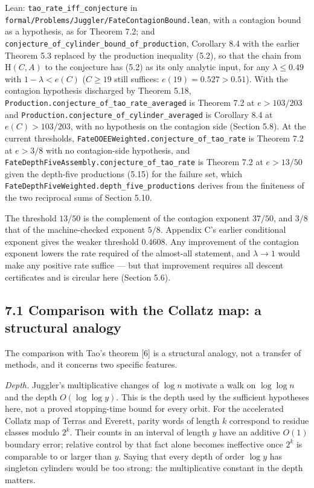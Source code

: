 \documentclass[11pt,a4paper]{article}
\begin{document}
Lean: \texttt{\nolinkurl{tao_rate_iff_conjecture}} in
\texttt{\nolinkurl{formal/Problems/Juggler/FateContagionBound.lean}},
with a contagion bound as a hypothesis, as for Theorem 7.2; and
\texttt{\nolinkurl{conjecture_of_cylinder_bound_of_production}},
Corollary 8.4 with the earlier Theorem 5.3 replaced by the production
inequality (5.2), so that the chain from \(\mathrm H(C,A)\) to the
conjecture has (5.2) as its only analytic input, for any
\(\lambda\le 0.49\) with \(1-\lambda<e(C)\) (\(C\ge 19\) still suffices:
\(e(19)=0.527>0.51\)). With the contagion hypothesis discharged by
Theorem 5.18,
\texttt{\nolinkurl{Production.conjecture_of_tao_rate_averaged}} is
Theorem 7.2 at \(e>103/203\) and
\texttt{\nolinkurl{Production.conjecture_of_cylinder_averaged}} is
Corollary 8.4 at \(e(C)>103/203\), with no hypothesis on the contagion
side (Section 5.8). At the current thresholds,
\texttt{\nolinkurl{FateOOEEWeighted.conjecture_of_tao_rate}} is Theorem
7.2 at \(e>3/8\) with no contagion-side hypothesis, and
\texttt{\nolinkurl{FateDepthFiveAssembly.conjecture_of_tao_rate}} is
Theorem 7.2 at \(e>13/50\) given the depth-five productions (5.15) for
the failure set, which
\texttt{\nolinkurl{FateDepthFiveWeighted.depth_five_productions}}
derives from the finiteness of the two reciprocal sums of Section 5.10.

The threshold \(13/50\) is the complement of the contagion exponent
\(37/50\), and \(3/8\) that of the machine-checked exponent \(5/8\).
Appendix C's earlier conditional exponent gives the weaker threshold
\(0.4608\). Any improvement of the contagion exponent lowers the rate
required of the almost-all statement, and \(\lambda\to 1\) would make
any positive rate suffice --- but that improvement requires all descent
certificates and is circular here (Section 5.6).

\subsection{7.1 Comparison with the Collatz map: a structural
analogy}\label{comparison-with-the-collatz-map-a-structural-analogy}

The comparison with Tao's theorem {[}6{]} is a structural analogy, not a
transfer of methods, and it concerns two specific features.

\emph{Depth.} Juggler's multiplicative changes of \(\log n\) motivate a
walk on \(\log\log n\) and the depth \(O(\log\log y)\). This is the
depth used by the sufficient hypotheses here, not a proved stopping-time
bound for every orbit. For the accelerated Collatz map of Terras and
Everett, parity words of length \(k\) correspond to residue classes
modulo \(2^k\). Their counts in an interval of length \(y\) have an
additive \(O(1)\) boundary error; relative control by that fact alone
becomes ineffective once \(2^k\) is comparable to or larger than \(y\).
Saying that every depth of order \(\log y\) has singleton cylinders
would be too strong: the multiplicative constant in the depth matters.
\end{document}
